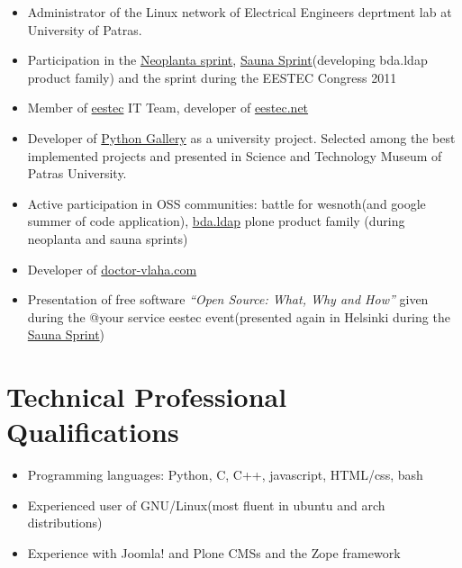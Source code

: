 \documentclass[letterpaper]{article}
\begin{document}
\begin{itemize}

\item Administrator of the Linux network of Electrical Engineers
  deprtment lab at University of Patras.

\item Participation in the \href{http://www.coactivate.org/projects/neoplanta-sprint/project-home}{Neoplanta sprint},
  \href{http://plone.org/events/community/sauna-sprint-2010/}{Sauna
    Sprint}(developing bda.ldap product family) and the sprint during
  the EESTEC Congress 2011

\item Member of \href{http://eestec.net}{eestec} IT Team, developer of \href{http://eestec.net}{eestec.net}

\item Developer of
  \href{http://code.google.com/p/pythongallery/}{Python Gallery} as a
  university project. Selected among the best implemented projects and
  presented in Science and Technology Museum of Patras University.

\item Active participation in OSS communities: battle for wesnoth(and
  google summer of code application), \href{http://pypi.python.org/pypi/bda.ldap/}{bda.ldap} plone product family
  (during neoplanta and sauna sprints)

\item Developer of \href{http://doctor-vlaha.com}{doctor-vlaha.com}

\item Presentation of free software {\it ``Open Source: What, Why and
    How''} given during the @your service eestec event(presented again
  in Helsinki during the \href{http://eestec.net/news-and-offers/plone-sauna-sprint-mid-term-report}{Sauna Sprint})

\end{itemize}

\section*{Technical Professional Qualifications}

\begin{itemize}
\item Programming languages: Python, C, C++, javascript, HTML/css, bash
\item Experienced user of GNU/Linux(most fluent in ubuntu and arch
  distributions)
\item Experience with Joomla! and Plone CMSs and the Zope framework
\end{itemize}
\end{document}
